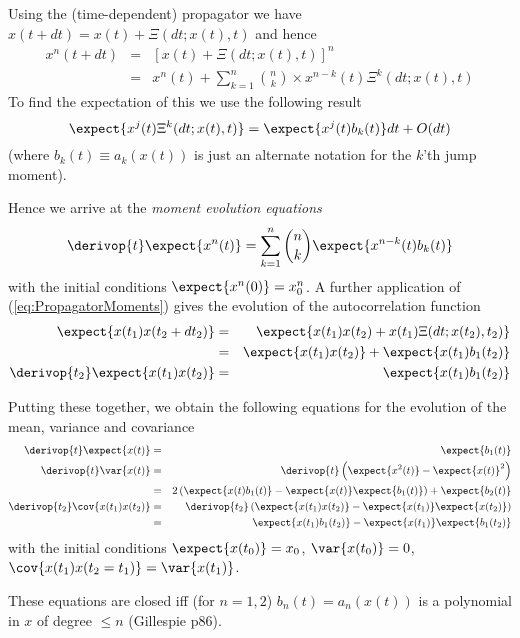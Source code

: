 \documentclass{beamer}
\begin{document}
\begin{frame}{}
 
  Using the (time-dependent) propagator we have $x(t+dt) = x(t) + \Xi(dt;x(t),t)$ and hence
\begin{eqnarray*}
  x^n(t+dt) & = & \left[ x(t) + \Xi(dt;x(t),t) \right]^n \\
  & = & x^n(t) + \sum_{k=1}^n \binom{n}{k} \times x^{n-k}(t) \Xi^k(dt;x(t),t)
\end{eqnarray*}
To find the expectation of this we use the following result %
\begin{equation}
\label{eq:PropagatorMoments}
\expect{x^j(t) \Xi^k(dt;x(t),t)} = \expect{x^j(t) b_k(t)} dt + O(dt)
\end{equation}
(where $b_k(t) \equiv a_k(x(t))$ is just an alternate notation for the $k$'th jump moment).
\end{frame}
\begin{frame}{}
Hence we arrive at the {\em moment evolution equations}
\[
\derivop{t} \expect{x^n(t)} = \sum_{k=1}^n \binom{n}{k} \expect{x^{n-k}(t) b_k(t)}
\]
with the initial conditions $\expect{x^n(0)} = x_0^n$.
  A further application of (\ref{eq:PropagatorMoments}) gives the evolution of the autocorrelation function
\begin{eqnarray*}
\expect{x(t_1)x(t_2+dt_2)} & = & \expect{x(t_1)x(t_2) + x(t_1)\Xi(dt;x(t_2),t_2)} \\
& = & \expect{x(t_1)x(t_2)} + \expect{x(t_1)b_1(t_2)} \\
\derivop{t_2} \expect{x(t_1)x(t_2)} & = & \expect{x(t_1)b_1(t_2)}
\end{eqnarray*}
\end{frame}
\begin{frame}{}
  Putting these together, we obtain the following equations for the evolution of the mean, variance and covariance
\begin{eqnarray*}
\derivop{t} \expect{x(t)} & = & \expect{b_1(t)} \\
\derivop{t} \var{x(t)} & = & \derivop{t} \left( \expect{x^2(t)} - \expect{x(t)}^2 \right) \\
& = & 2\left( \expect{x(t)b_1(t)} - \expect{x(t)}\expect{b_1(t)} \right) + \expect{b_2(t)} \\
\derivop{t_2} \cov{x(t_1)x(t_2)} & = & \derivop{t_2} \left( \expect{x(t_1)x(t_2)} - \expect{x(t_1)}\expect{x(t_2)} \right) \\
& = & \expect{x(t_1)b_1(t_2)} - \expect{x(t_1)}\expect{b_1(t_2)}
\end{eqnarray*}
with the initial conditions
$\expect{x(t_0)} = x_0$,
$\var{x(t_0)} = 0$,
$\cov{x(t_1)x(t_2=t_1)} = \var{x(t_1)}$.

These equations are closed iff (for $n=1,2$) $b_n(t)=a_n(x(t))$ is a polynomial in $x$ of degree $\leq n$ (Gillespie p86).
 
\end{frame}
\end{document}
